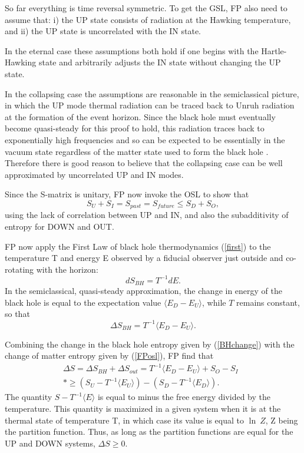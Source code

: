 \documentclass{article}
\begin{document}
So far everything is time reversal symmetric.  To get the GSL, FP also need to assume that: i) the UP state consists of radiation at the Hawking temperature, and ii) the UP state is uncorrelated with the IN state.

In the eternal case these assumptions both hold if one begins with the Hartle-Hawking state and arbitrarily adjusts the IN state without changing the UP state.

In the collapsing case the assumptions are reasonable in the semiclassical picture, in which the UP mode thermal radiation can be traced back to Unruh radiation at the formation of the event horizon.  Since the black hole must eventually become quasi-steady for this proof to hold, this radiation traces back to exponentially high frequencies and so can be expected to be essentially in the vacuum state regardless of the matter state used to form the black hole \cite{FP93}.  Therefore there is good reason to believe that the collapsing case can be well approximated by uncorrelated UP and IN modes.

Since the S-matrix is unitary, FP now invoke the OSL to show that
\begin{equation}\label{FPosl}
S_{U} + S_{I} = S_{past} = S_{future} \le S_{D} + S_{O},
\end{equation}
using the lack of correlation between UP and IN, and also the subadditivity of entropy for DOWN and OUT.

FP now apply the First Law of black hole thermodynamics (\ref{first}) to the temperature T and energy E observed by a fiducial observer just outside and co-rotating with the horizon:
\begin{equation}
dS_{BH} = T^{-1}dE.
\end{equation}
In the semiclassical, quasi-steady approximation, the change in energy of the black hole is equal to the expectation value $\langle E_{D} - E_{U} \rangle$, while $T$ remains constant, so that
\begin{equation}\label{BHchange}
\Delta S_{BH} = T^{-1} \langle E_{D} - E_{U} \rangle.
\end{equation}

Combining the change in the black hole entropy given by (\ref{BHchange})
with the change of matter entropy given by (\ref{FPosl}), FP find that
\begin{eqnarray}
\Delta S = \Delta S_{BH} + \Delta S_{out} = T^{-1}\langle E_{D} - E_{U} \rangle + S_{O} - S_{I}
   \\*	
   \ge (S_{U} - T^{-1}\langle E_{U} \rangle) 
     - (S_{D} - T^{-1}\langle E_{D} \rangle).\phantom{MMM}
\end{eqnarray}
The quantity $S - T^{-1} \langle E \rangle $ is equal to minus the free energy divided by the temperature.  This quantity is maximized in a given system when it is at the thermal state of temperature T, in which case its value is equal to $\ln \: Z$, Z being the partition function.  Thus, as long as the partition functions are equal for the UP and DOWN systems, 
$\Delta S \ge 0$.
\end{document}
